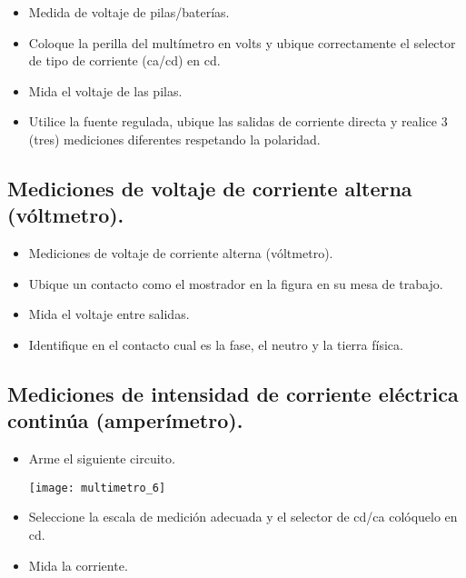 \documentclass[11pt]{article}
\newenvironment{Figuras}
  {\par\medskip\noindent\minipage{\linewidth}}
  {\endminipage\par\medskip}
\begin{document}
\begin{multicols}{2}
	\begin{itemize}

		\item Medida de voltaje de pilas/baterías.
		\item Coloque la perilla del multímetro en volts y ubique correctamente el selector de tipo de corriente (ca/cd) en cd.
		\item Mida el voltaje de las pilas.
		\item Utilice la fuente regulada, ubique las salidas de corriente directa y realice 3 (tres) mediciones diferentes respetando la polaridad.

	\end{itemize}


	\subsection{Mediciones de voltaje de corriente alterna (vóltmetro).}

	\begin{itemize}

		\item Mediciones de voltaje de corriente alterna (vóltmetro).
		\item Ubique un contacto como el mostrador en la figura en su mesa de trabajo.
		\item Mida el voltaje entre salidas.
		\item Identifique en el contacto cual es la fase, el neutro y la tierra física.
	\end{itemize}

	\subsection{Mediciones de intensidad de corriente eléctrica continúa (amperímetro).}

	\begin{itemize}

		\item Arme el siguiente circuito.
			\begin{Figuras}
				\centering
    				\texttt{[image: multimetro\_6]}
			    	\label{}
			\end{Figuras}
		\item Seleccione la escala de medición adecuada y el selector de cd/ca colóquelo en cd.
		\item Mida la corriente.
	\end{itemize}


\end{multicols}
\end{document}
